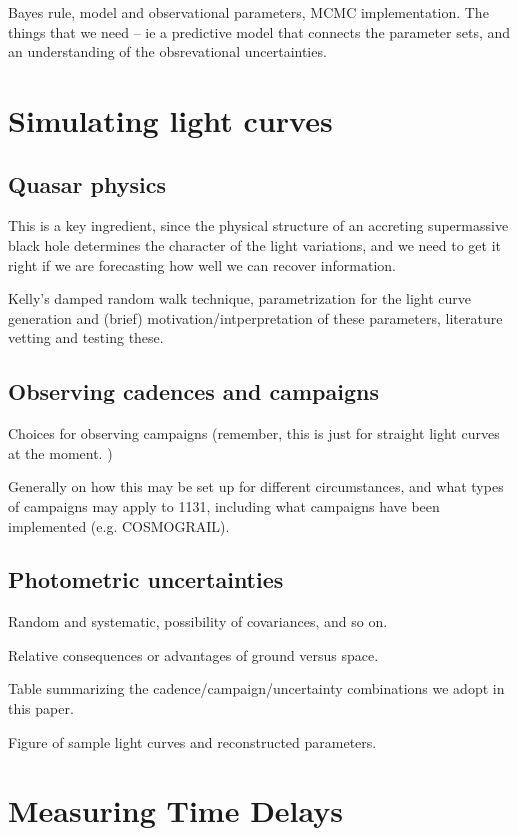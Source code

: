 \documentclass{emulateapj}
\begin{document}
Bayes rule, model and observational parameters, MCMC implementation. The things that we need -- ie a predictive model that connects the parameter sets, and an understanding of the obsrevational uncertainties.

\section{Simulating light curves}
\subsection{Quasar physics}

This is a key ingredient, since the physical structure of an accreting supermassive black hole determines the character of the light variations, and we need to get it right if we are forecasting how well we can recover information. 

Kelly's damped random walk technique, parametrization for the light curve generation and (brief) motivation/intperpretation of these parameters, literature vetting and testing these. 
\subsection{Observing cadences and campaigns}\label{}

Choices for observing campaigns (remember, this is just for straight light curves at the moment. )

Generally on how this may be set up for different circumstances, and what types of campaigns may apply to 1131, including what campaigns have been implemented (e.g. COSMOGRAIL). 

\subsection{Photometric uncertainties}\label{}

Random and systematic, possibility of covariances, and so on.  

Relative consequences or advantages of ground versus space. 

Table summarizing the cadence/campaign/uncertainty combinations we adopt in this paper. 

Figure of sample light curves and reconstructed parameters. 


\section{Measuring Time Delays}
\end{document}
